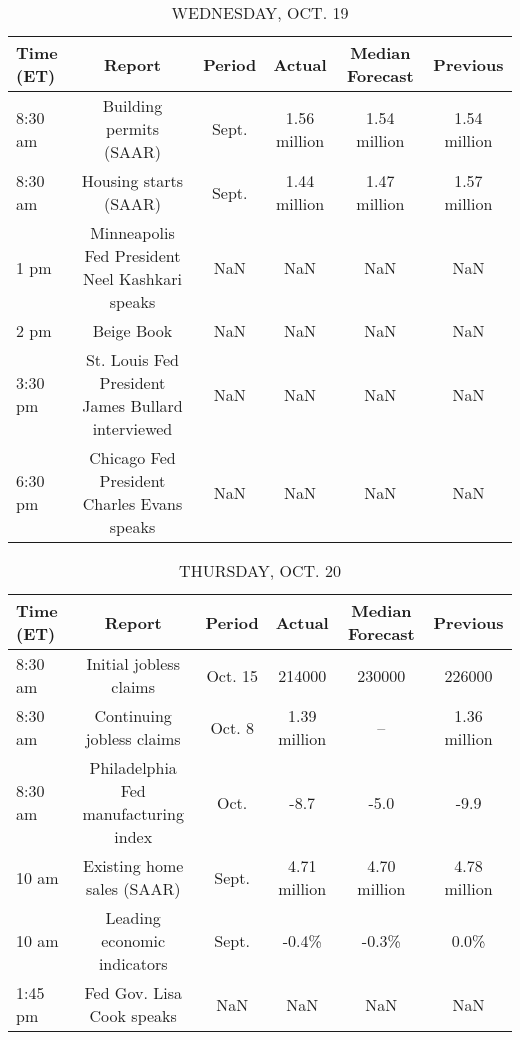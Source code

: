 \documentclass{article}%
\begin{document}
\begin{table}[htbp]%
\caption{WEDNESDAY, OCT. 19}%
\centering%
\begin{adjustbox}{width=1\textwidth}%
\begin{tabular}{lccccc}
\toprule
Time (ET) &                                            Report & Period &       Actual & Median Forecast &     Previous \\
\midrule
  8:30 am &                           Building permits (SAAR) &  Sept. & 1.56 million &    1.54 million & 1.54 million \\
  8:30 am &                             Housing starts (SAAR) &  Sept. & 1.44 million &    1.47 million & 1.57 million \\
     1 pm &    Minneapolis Fed President Neel Kashkari speaks &    NaN &          NaN &             NaN &          NaN \\
     2 pm &                                        Beige Book &    NaN &          NaN &             NaN &          NaN \\
  3:30 pm & St. Louis Fed President James Bullard interviewed &    NaN &          NaN &             NaN &          NaN \\
  6:30 pm &        Chicago Fed President Charles Evans speaks &    NaN &          NaN &             NaN &          NaN \\
\bottomrule
\end{tabular}
%
\end{adjustbox}%
\end{table}

%


\begin{table}[htbp]%
\caption{THURSDAY, OCT. 20}%
\centering%
\begin{adjustbox}{width=1\textwidth}%
\begin{tabular}{lccccc}
\toprule
Time (ET) &                               Report &  Period &       Actual & Median Forecast &     Previous \\
\midrule
  8:30 am &               Initial jobless claims & Oct. 15 &       214000 &          230000 &       226000 \\
  8:30 am &            Continuing jobless claims &  Oct. 8 & 1.39 million &              -- & 1.36 million \\
  8:30 am & Philadelphia Fed manufacturing index &    Oct. &         -8.7 &            -5.0 &         -9.9 \\
    10 am &           Existing home sales (SAAR) &   Sept. & 4.71 million &    4.70 million & 4.78 million \\
    10 am &          Leading economic indicators &   Sept. &        -0.4\% &           -0.3\% &         0.0\% \\
  1:45 pm &            Fed Gov. Lisa Cook speaks &     NaN &          NaN &             NaN &          NaN \\
\bottomrule
\end{tabular}
%
\end{adjustbox}%
\end{table}
\end{document}
